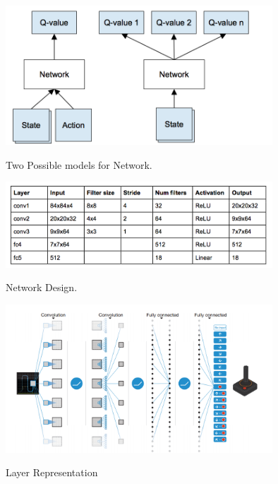\documentclass[a4paper,11pt]{report}
\begin{document}
					\begin{figure}[!ht]
						\begin{centering}
							\includegraphics[width=10cm]{../Design/images/deep.png}\\
							\caption{Two Possible models for Network.}
						\end{centering}
					\end{figure}

					\begin{figure}[!ht]
						\begin{centering}
							\includegraphics[width=10cm]{../Design/images/deep2.png}\\
							\caption{Network Design.}
						\end{centering}
					\end{figure}

					\begin{figure}[!ht]
						\begin{centering}
							\includegraphics[width=10cm]{../Design/images/deep4.png}\\
							\caption{Layer Representation}
						\end{centering}
					\end{figure}
\end{document}
